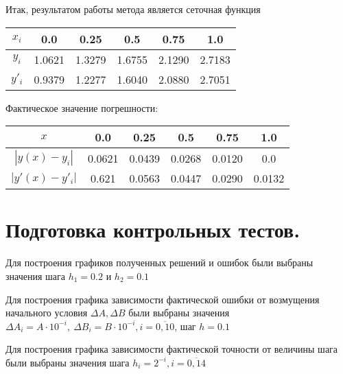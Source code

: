 \documentclass[a4paper, 12pt]{article}
\begin{document}
	Итак, результатом работы метода является сеточная функция
	\begin{center}
	\begin{tabular}{| c | c | c | c | c | c |}
		\hline
		$x_i$ & 0.0 & 0.25 & 0.5 & 0.75 & 1.0\\ \hline
		$y_i$ & 1.0621 & 1.3279 & 1.6755 & 2.1290 & 2.7183\\ \hline
		$y'_i$ & 0.9379 & 1.2277 & 1.6040 & 2.0880 & 2.7051\\ \hline
	\end{tabular}
	\end{center}
	
	Фактическое значение погрешности:
	\begin{center}
	\begin{tabular}{| c | c | c | c | c | c |}
		\hline
		$x$ & 0.0 & 0.25 & 0.5 & 0.75 & 1.0\\ \hline
		$|y(x)-y_i|$ & 0.0621 & 0.0439 & 0.0268 & 0.0120 & 0.0\\ \hline
		$|y'(x)-y'_i|$ & 0.621 & 0.0563 & 0.0447 & 0.0290 & 0.0132\\ \hline
	\end{tabular}
	\end{center}
	
	\section{Подготовка контрольных тестов.}
	
	Для построения графиков полученных решений и ошибок были выбраны значения шага $h_1=0.2$ и $h_2=0.1$
	
	Для построения графика зависимости фактической ошибки от возмущения начального условия $\Delta A, \Delta B$ были выбраны значения $\Delta A_i=A\cdot10^{-i},\ \Delta B_i=B\cdot 10^{-i}, i=\overline{0,10}$, шаг $h=0.1$
	
	Для построения графика зависимости фактической точности от величины шага были выбраны значения шага $h_i=2^{-i}, i=\overline{0,14}$
	
\end{document}
